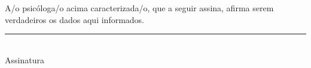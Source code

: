 \documentclass[openright, oneside, a4paper, article, brazil]{abntex2}
\begin{document}
\normalfont\normalsize\setasuspacing{\OnehalfSpacing}
A/o psicóloga/o acima caracterizada/o, que a seguir assina, afirma serem verdadeiros os dados aqui informados.
\vspace{1.618\baselineskip}

\vfill

\centering
\rule{24em}{0.4pt}\\
Assinatura
\clearpage
\end{document}
